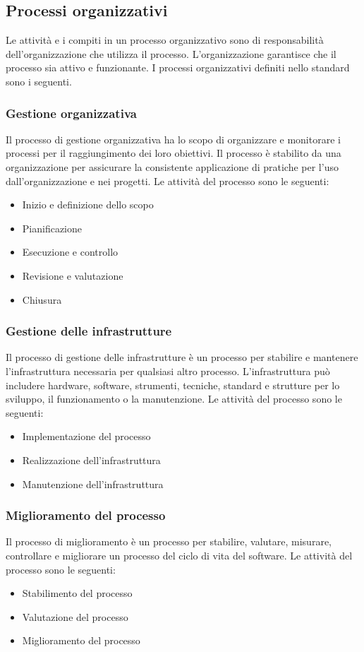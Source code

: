 \subsection{Processi organizzativi}
Le attività e i compiti in un processo organizzativo sono di responsabilità dell'organizzazione che utilizza il processo. L'organizzazione garantisce che il processo sia attivo e funzionante.
I processi organizzativi definiti nello standard sono i seguenti.

\subsubsection{Gestione organizzativa}
Il processo di gestione organizzativa ha lo scopo di organizzare e monitorare i processi per il raggiungimento dei loro obiettivi. Il processo è stabilito da una organizzazione per assicurare la consistente applicazione di pratiche per l'uso dall'organizzazione e nei progetti.
Le attività del processo sono le seguenti:
\begin{itemize}
\item Inizio e definizione dello scopo
\item Pianificazione 
\item Esecuzione e controllo
\item Revisione e valutazione
\item Chiusura
\end{itemize}
\subsubsection{Gestione delle infrastrutture}
Il processo di gestione delle infrastrutture è un processo per stabilire e mantenere l'infrastruttura necessaria per qualsiasi altro processo. L'infrastruttura può includere hardware, software, strumenti, tecniche, standard e strutture per lo sviluppo, il funzionamento o la manutenzione.
Le attività del processo sono le seguenti:
\begin{itemize}
\item Implementazione del processo
\item Realizzazione dell'infrastruttura
\item Manutenzione dell'infrastruttura
\end{itemize}

\subsubsection{Miglioramento del processo}
Il processo di miglioramento è un processo per stabilire, valutare, misurare, controllare e migliorare un processo del ciclo di vita del software.
Le attività del processo sono le seguenti:
\begin{itemize}
\item Stabilimento del processo
\item Valutazione del processo
\item Miglioramento del processo
\end{itemize}

